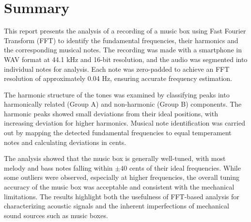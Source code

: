 \chapter*{Summary}

This report presents the analysis of a recording of a music box  using Fast Fourier Transform (FFT) to identify the fundamental frequencies, their harmonics and the corresponding musical notes. The recording was made with a smartphone in WAV format at 44.1 kHz and 16-bit resolution, and the audio was segmented into individual notes for analysis. Each note was zero-padded to achieve an FFT resolution of approximately 0.04 Hz, ensuring accurate frequency estimation.

The harmonic structure of the tones was examined by classifying peaks into harmonically related (Group A) and non-harmonic (Group B) components. The harmonic peaks showed small deviations from their ideal positions, with increasing deviation for higher harmonics. Musical note identification was carried out by mapping the detected fundamental frequencies to equal temperament notes and calculating deviations in cents.

The analysis showed that the music box is generally well-tuned, with most melody and bass notes falling within $\pm40$ cents of their ideal frequencies. While some outliers were observed, especially at higher frequencies, the overall tuning accuracy of the music box was acceptable and consistent with the mechanical limitations. The results highlight both the usefulness of FFT-based analysis for characterizing acoustic signals and the inherent imperfections of mechanical sound sources such as music boxes.


